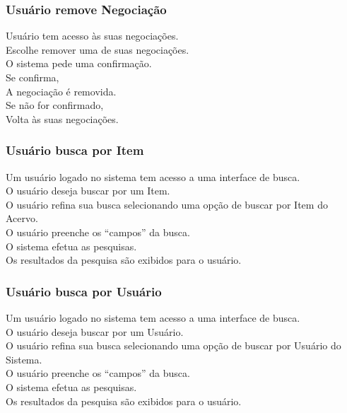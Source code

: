 \subsubsection{Usuário remove Negociação}
\begin{tabbing}
\pgs
\>\>Usuário tem acesso às suas negociações.\\
\>\>Escolhe remover uma de suas negociações.\\
\>\>O sistema pede uma confirmação.\\
\>\>Se confirma,\\
\>\>\>A negociação é removida.\\
\>\>Se não for confirmado,\\
\>\>\>Volta às suas negociações.
\end{tabbing}

\subsubsection{Usuário busca por Item}
\begin{tabbing}
\pgs
\>\>Um usuário logado no sistema tem acesso a uma interface de busca.\\
\>\>O usuário deseja buscar por um Item.\\
\>\>O usuário refina sua busca selecionando uma opção de buscar por Item do Acervo.\\
\>\>O usuário preenche os ``campos'' da busca.\\
\>\>O sistema efetua as pesquisas.\\
\>\>Os resultados da pesquisa são exibidos para o usuário.
\end{tabbing}

\subsubsection{Usuário busca por Usuário}
\begin{tabbing}
\pgs
\>\>Um usuário logado no sistema tem acesso a uma interface de busca.\\
\>\>O usuário deseja buscar por um Usuário.\\
\>\>O usuário refina sua busca selecionando uma opção de buscar por Usuário do Sistema.\\
\>\>O usuário preenche os ``campos'' da busca.\\
\>\>O sistema efetua as pesquisas.\\
\>\>Os resultados da pesquisa são exibidos para o usuário.
\end{tabbing}

